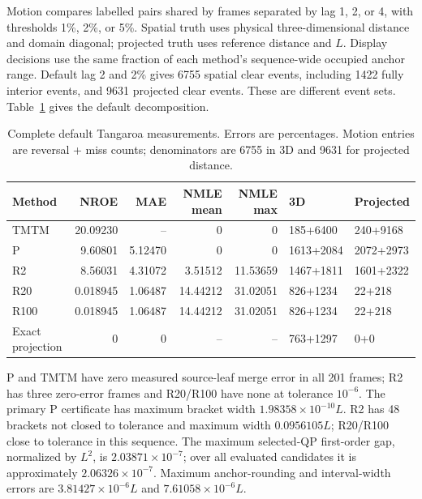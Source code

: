 Motion compares labelled pairs shared by frames separated by lag 1, 2, or 4, with thresholds 1\%, 2\%, or 5\%. Spatial truth uses physical three-dimensional distance and domain diagonal; projected truth uses reference distance and $L$. Display decisions use the same fraction of each method's sequence-wide occupied anchor range. Default lag 2 and 2\% gives 6755 spatial clear events, including 1422 fully interior events, and 9631 projected clear events. These are different event sets. Table~\ref{tab:s_volume_complete} gives the default decomposition.

\begin{table}[H]\centering\small
\caption{Complete default Tangaroa measurements. Errors are percentages. Motion entries are reversal + miss counts; denominators are 6755 in 3D and 9631 for projected distance.}\label{tab:s_volume_complete}
\setlength{\tabcolsep}{4pt}
\begin{tabular}{lrrrrll}\toprule
Method & NROE & MAE & NMLE mean & NMLE max & 3D & Projected\\\midrule
TMTM & 20.09230 & -- & 0 & 0 & 185+6400 & 240+9168\\
P & 9.60801 & 5.12470 & 0 & 0 & 1613+2084 & 2072+2973\\
R2 & 8.56031 & 4.31072 & 3.51512 & 11.53659 & 1467+1811 & 1601+2322\\
R20 & 0.018945 & 1.06487 & 14.44212 & 31.02051 & 826+1234 & 22+218\\
R100 & 0.018945 & 1.06487 & 14.44212 & 31.02051 & 826+1234 & 22+218\\
Exact projection & 0 & 0 & -- & -- & 763+1297 & 0+0\\
\bottomrule\end{tabular}
\end{table}

P and TMTM have zero measured source-leaf merge error in all 201 frames; R2 has three zero-error frames and R20/R100 have none at tolerance $10^{-6}$. The primary P certificate has maximum bracket width $1.98358\times10^{-10}L$. R2 has 48 brackets not closed to tolerance and maximum width $0.0956105L$; R20/R100 close to tolerance in this sequence. The maximum selected-QP first-order gap, normalized by $L^2$, is $2.03871\times10^{-7}$; over all evaluated candidates it is approximately $2.06326\times10^{-7}$. Maximum anchor-rounding and interval-width errors are $3.81427\times10^{-6}L$ and $7.61058\times10^{-6}L$.

